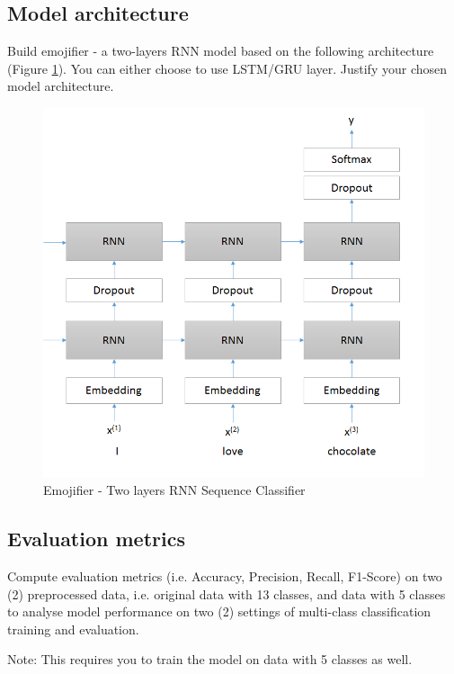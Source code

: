 \documentclass[a4paper,twoside,10pt]{article}
\begin{document}
\subsection*{Model architecture}

Build emojifier - a two-layers RNN model based on the following architecture (Figure \ref{fig:rnnmodel}). You can either choose to use LSTM/GRU layer. Justify your chosen model architecture.

\begin{figure}[ht]
\centering
\includegraphics[scale=.6]{figures/model.png}
\caption{Emojifier - Two layers RNN Sequence Classifier}
\label{fig:rnnmodel}
\end{figure}  

\subsection*{Evaluation metrics}

Compute evaluation metrics (i.e. Accuracy, Precision, Recall, F1-Score) on two (2) preprocessed data, i.e. original data with 13 classes, and data with 5 classes to analyse model performance on two (2) settings of multi-class classification training and evaluation.

\justify
Note: This requires you to train the model on data with 5 classes as well. 
\end{document}

